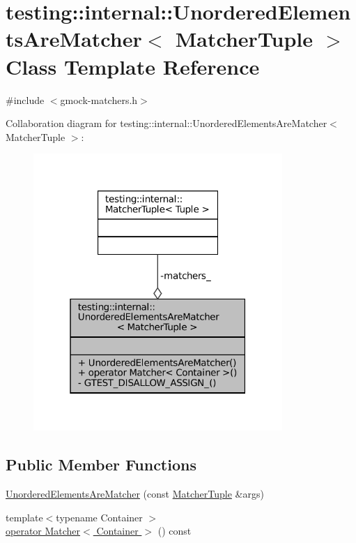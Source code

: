 \hypertarget{classtesting_1_1internal_1_1UnorderedElementsAreMatcher}{}\section{testing\+:\+:internal\+:\+:Unordered\+Elements\+Are\+Matcher$<$ Matcher\+Tuple $>$ Class Template Reference}
\label{classtesting_1_1internal_1_1UnorderedElementsAreMatcher}


{\ttfamily \#include $<$gmock-\/matchers.\+h$>$}



Collaboration diagram for testing\+:\+:internal\+:\+:Unordered\+Elements\+Are\+Matcher$<$ Matcher\+Tuple $>$\+:
\nopagebreak
\begin{figure}[H]
\begin{center}
\leavevmode
\includegraphics[width=268pt]{classtesting_1_1internal_1_1UnorderedElementsAreMatcher__coll__graph}
\end{center}
\end{figure}
\subsection*{Public Member Functions}
\begin{DoxyCompactItemize}
\item 
\hyperlink{classtesting_1_1internal_1_1UnorderedElementsAreMatcher_ae0a46833600dc8ef768d154ab111f5fa}{Unordered\+Elements\+Are\+Matcher} (const \hyperlink{structtesting_1_1internal_1_1MatcherTuple}{Matcher\+Tuple} \&args)
\item 
{\footnotesize template$<$typename Container $>$ }\\\hyperlink{classtesting_1_1internal_1_1UnorderedElementsAreMatcher_a5191cb321191985e257225b9a5df95f5}{operator Matcher$<$ Container $>$} () const
\end{DoxyCompactItemize}
